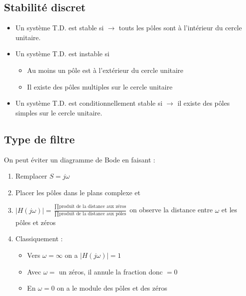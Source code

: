 \documentclass[9pt]{article}
\begin{document}
\begin{multicols}{2}
\subsection{Stabilité discret}
\begin{itemize}
    \item Un système T.D. est stable si $\rightarrow$ touts les pôles sont à l'intérieur du cercle unitaire.
    \item Un système T.D. est instable si \begin{itemize}
        \item Au moins un pôle est à l'extérieur du cercle unitaire
        \item Il existe des pôles multiples sur le cercle unitaire
    \end{itemize}
    \item Un système T.D. est conditionnellement stable si $\rightarrow$ il existe des pôles simples sur le cercle unitaire.
\end{itemize}
\subsection{Type de filtre}
On peut éviter un diagramme de Bode en faisant : 
\begin{enumerate}
    \item Remplacer $ S=j \omega  $ 
    \item Placer les pôles dans le plans complexe et 
    \item $ \left| H(j \omega ) \right| = \frac{\prod_{}^{}\text{produit de la distance aux zéros}}{\prod_{}^{}\text{produit de la distance aux pôles}}  $ on observe la distance entre $ \omega $ et les pôles et zéros
    \item Classiquement : \begin{itemize}
        \item Vers $ \omega = \infty  $ on a $ \left| H(j \omega ) \right| = 1 $ 
        \item Avec $ \omega =  $ un zéros, il annule la fraction donc $ = 0 $ 
        \item En $ \omega = 0 $ on a le module des pôles et des zéros
    \end{itemize}
\end{enumerate}


\end{multicols}
\end{document}
